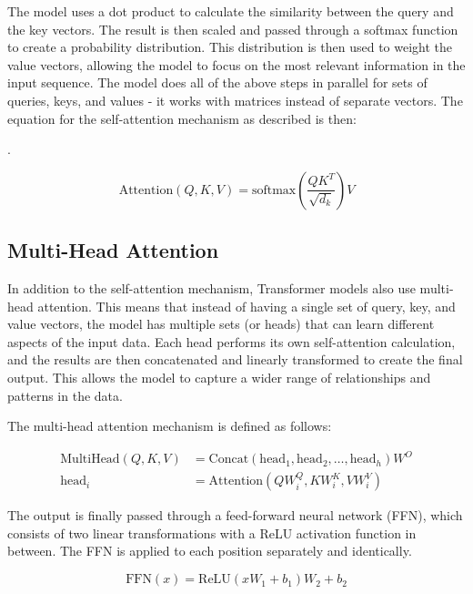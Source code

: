 \documentclass[twoside]{ctuthesis}
\theoremstyle{plain}
\theoremstyle{definition}
\theoremstyle{note}
\begin{document}
The model uses a dot product to calculate the similarity between the query and the key vectors. The result is then scaled and passed through a softmax function to create a probability distribution. This distribution is then used to weight the value vectors, allowing the model to focus on the most relevant information in the input sequence. The model does all of the above steps in parallel for sets of queries, keys, and values - it works with matrices instead of separate vectors. The equation for the self-attention mechanism as described is then: \par.

\begin{equation}
	\text{Attention}(Q, K, V) = \text{softmax}\left(\frac{QK^T}{\sqrt{d_k}}\right)V
\end{equation}


\subsection{Multi-Head Attention}

In addition to the self-attention mechanism, Transformer models also use multi-head attention. This means that instead of having a single set of query, key, and value vectors, the model has multiple sets (or heads) that can learn different aspects of the input data. Each head performs its own self-attention calculation, and the results are then concatenated and linearly transformed to create the final output. This allows the model to capture a wider range of relationships and patterns in the data.\par
The multi-head attention mechanism is defined as follows:

\begin{align}
 \text{MultiHead}(Q, K, V) &= \text{Concat}(\text{head}_1, \text{head}_2, \ldots, \text{head}_h)W^O \\
 \text{head}_i &= \text{Attention}(QW_i^Q, KW_i^K, VW_i^V)
\end{align}

The output is finally passed through a feed-forward neural network (FFN), which consists of two linear transformations with a ReLU activation function in between. The FFN is applied to each position separately and identically.\par

\begin{equation}
 \text{FFN}(x) = \text{ReLU}(xW_1 + b_1)W_2 + b_2 
\end{equation}
\end{document}
